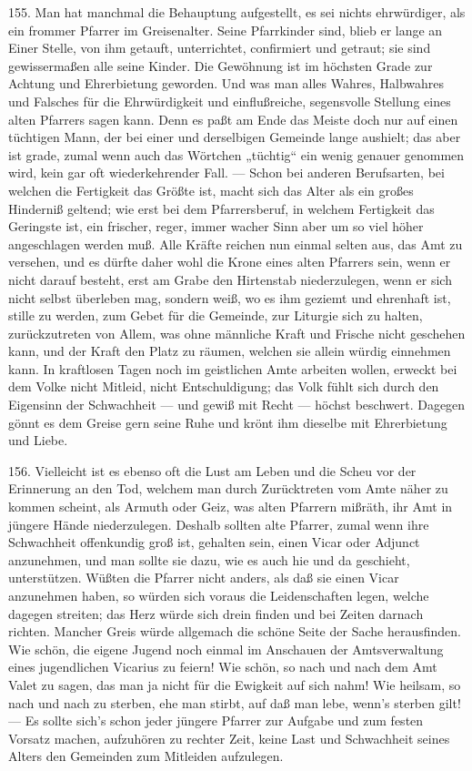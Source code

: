 155. Man hat manchmal die Behauptung aufgestellt, es sei nichts ehrwürdiger, als ein frommer Pfarrer im Greisenalter. Seine Pfarrkinder sind, blieb er lange an Einer Stelle, von ihm getauft, unterrichtet, confirmiert und getraut; sie sind gewissermaßen alle seine Kinder. Die Gewöhnung ist im höchsten Grade zur Achtung und Ehrerbietung geworden. Und was man alles Wahres, Halbwahres und Falsches für die Ehrwürdigkeit und einflußreiche, segensvolle Stellung eines alten Pfarrers sagen kann. Denn es paßt am Ende das Meiste doch nur auf einen tüchtigen Mann, der bei einer und derselbigen Gemeinde lange aushielt; das aber ist grade, zumal wenn auch das Wörtchen „tüchtig“ ein wenig genauer genommen wird, kein gar oft wiederkehrender Fall. — Schon bei anderen Berufsarten, bei welchen die Fertigkeit das Größte ist, macht sich das Alter als ein großes Hinderniß geltend; wie erst bei dem Pfarrersberuf, in welchem Fertigkeit das Geringste ist, ein frischer, reger, immer wacher Sinn aber um so viel höher angeschlagen werden muß. Alle Kräfte reichen nun einmal selten aus, das Amt zu versehen, und es dürfte daher wohl die Krone eines alten Pfarrers sein, wenn er nicht darauf besteht, erst am Grabe den Hirtenstab niederzulegen, wenn er sich nicht selbst überleben mag, sondern weiß, wo es ihm geziemt und ehrenhaft ist, stille zu werden, zum Gebet für die Gemeinde, zur Liturgie sich zu halten, zurückzutreten von Allem, was ohne männliche Kraft und Frische
nicht geschehen kann, und der Kraft den Platz zu räumen, welchen sie allein würdig einnehmen kann. In kraftlosen Tagen noch im geistlichen Amte arbeiten wollen, erweckt bei dem Volke nicht Mitleid, nicht Entschuldigung; das Volk fühlt sich durch den Eigensinn der Schwachheit — und gewiß mit Recht — höchst beschwert. Dagegen gönnt es dem Greise gern seine Ruhe und krönt ihm dieselbe mit Ehrerbietung und Liebe.

156. Vielleicht ist es ebenso oft die Lust am Leben und die Scheu vor der Erinnerung an den Tod, welchem man durch Zurücktreten vom Amte näher zu kommen scheint, als Armuth oder Geiz, was alten Pfarrern mißräth, ihr Amt in jüngere Hände niederzulegen. Deshalb sollten alte Pfarrer, zumal wenn ihre Schwachheit offenkundig groß ist, gehalten sein, einen Vicar oder Adjunct anzunehmen, und man sollte sie dazu, wie es auch hie und da geschieht, unterstützen. Wüßten die Pfarrer nicht anders, als daß sie einen Vicar anzunehmen haben, so würden sich voraus die Leidenschaften legen, welche dagegen streiten; das Herz würde sich drein finden und bei Zeiten darnach richten. Mancher Greis würde allgemach die schöne Seite der Sache herausfinden. Wie schön, die eigene Jugend noch einmal im Anschauen der Amtsverwaltung eines jugendlichen Vicarius zu feiern! Wie schön, so nach und nach dem Amt Valet zu sagen, das man ja nicht für die Ewigkeit auf sich nahm! Wie heilsam, so nach und nach zu sterben, ehe man stirbt, auf daß man lebe, wenn’s sterben gilt! — Es sollte sich’s schon jeder jüngere Pfarrer zur Aufgabe und zum festen Vorsatz machen, aufzuhören zu rechter
Zeit, keine Last und Schwachheit seines Alters den Gemeinden zum Mitleiden aufzulegen.

